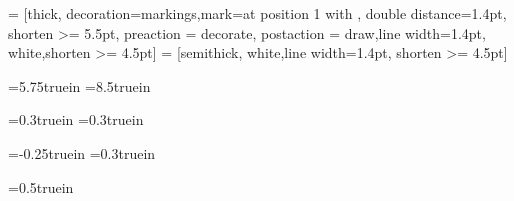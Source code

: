 

\usepackage{amsfonts}
\usepackage{amsthm}
\usepackage{amssymb}
\usepackage{amsmath}
\usepackage{enumerate}
\usepackage{fancyhdr}
\usepackage{mathabx}
\usepackage{verbatim}
\usepackage{geometry}
\usepackage{tikz}


\usetikzlibrary{arrows,positioning,decorations.markings} 
 = [thick, decoration={markings,mark=at position
   1 with {}},
   double distance=1.4pt, shorten >= 5.5pt,
   preaction = {decorate},
   postaction = {draw,line width=1.4pt, white,shorten >= 4.5pt}]
 = [semithick, white,line width=1.4pt, shorten >= 4.5pt]


\usepackage[all]{xy}


\textwidth=5.75truein
\textheight=8.5truein



\oddsidemargin=0.3truein
\evensidemargin=0.3truein

\topmargin=-0.25truein
\headheight=13pt
\headsep=0.3truein

\footskip=0.5truein

\parindent=18pt
\parskip=0pt
\linespread{1.02}

\newcommand{\N}{\mathbb{N}}
\newcommand{\Z}{\mathbb{Z}}
\newcommand{\R}{\mathbb{R}}
\newcommand{\Q}{\mathbb{Q}}
\newcommand{\C}{\mathbb{C}}
\newcommand{\T}{\mathbb{T}}
\newcommand{\h}{\mathcal{H}}
\newcommand{\Manoa}{M\=anoa}
\newcommand{\Hawaii}{Hawai\kern.05em`\kern.05em\relax i}
\theoremstyle{plain}
\newtheorem{theorem}{Theorem}[section]
\newtheorem{lemma}[theorem]{Lemma}
\newtheorem{corollary}[theorem]{Corollary}
\newtheorem{proposition}[theorem]{Proposition}
\newtheorem{conjecture}[theorem]{Conjecture}
\newtheorem{definition-theorem}[theorem]{Definition / Theorem}
\newtheorem{project}[theorem]{Project}

